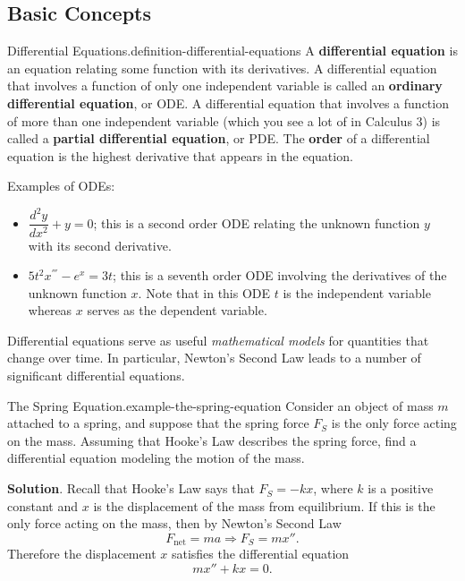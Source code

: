 \documentclass[10pt,]{book}
\newcommand{\terminology}[1]{\textbf{#1}}
\numberwithin{equation}{section}
\newcommand{\dv}[3][]{\dfrac{d^{#1} #2}{d #3^{#1}}}
\begin{document}
\subsection[{Basic Concepts}]{Basic Concepts}\label{subsection-basic-concepts}
\begin{definition}{Differential Equations.}{definition-differential-equations}%
\hypertarget{p-715}{}%
A \terminology{differential equation} is an equation relating some function with its derivatives. A differential equation that involves a function of only one independent variable is called an \terminology{ordinary differential equation}, or ODE. A differential equation that involves a function of more than one independent variable (which you see a lot of in Calculus 3) is called a \terminology{partial differential equation}, or PDE. The \terminology{order} of a differential equation is the highest derivative that appears in the equation.%
\end{definition}
\hypertarget{p-716}{}%
Examples of ODEs: \leavevmode%
\begin{itemize}[label=\textbullet]
\item{}\hypertarget{p-717}{}%
\(\dv[2]{y}{x} + y = 0\); this is a second order ODE relating the unknown function \(y\) with its second derivative.%
\item{}\hypertarget{p-718}{}%
\(5t^{2}x^{'''} - e^{x} = 3t\); this is a seventh order ODE involving the derivatives of the unknown function \(x\). Note that in this ODE \(t\) is the independent variable whereas \(x\) serves as the dependent variable.%
\end{itemize}
%
\par
\hypertarget{p-719}{}%
Differential equations serve as useful \emph{mathematical models} for quantities that change over time. In particular, Newton's Second Law leads to a number of significant differential equations.%
\begin{example}{The Spring Equation.}{example-the-spring-equation}%
\hypertarget{p-720}{}%
Consider an object of mass \(m\) attached to a spring, and suppose that the spring force \(F_{S}\) is the only force acting on the mass. Assuming that Hooke's Law describes the spring force, find a differential equation modeling the motion of the mass.%
\par\smallskip%
\noindent\textbf{Solution}.\hypertarget{solution-152}{}\quad%
\hypertarget{p-721}{}%
Recall that Hooke's Law says that \(F_{S} = -kx\), where \(k\) is a positive constant and \(x\) is the displacement of the mass from equilibrium. If this is the only force acting on the mass, then by Newton's Second Law%
\begin{equation*}
F_{\text{net}} = ma \Rightarrow F_{S} = mx''.
\end{equation*}
Therefore the displacement \(x\) satisfies the differential equation%
\begin{equation*}
mx'' + kx = 0.
\end{equation*}
%
\end{example}
\end{document}
